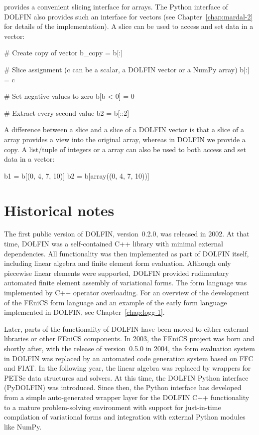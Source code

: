 \numpy provides a convenient slicing interface for \numpy arrays. The
Python interface of DOLFIN also provides such an interface for vectors
(see Chapter~\ref{chap:mardal-2} for details of the implementation). A
slice can be used to access and set data in a vector:
\begin{python}
# Create copy of vector
b_copy = b[:]

# Slice assignment (c can be a scalar, a DOLFIN vector or a NumPy array)
b[:] = c

# Set negative values to zero
b[b < 0] = 0

# Extract every second value
b2 = b[::2]
\end{python}
A difference between a \numpy slice and a slice of a DOLFIN vector is
that a slice of a \numpy array provides a view into the original array,
whereas in DOLFIN we provide a copy. A list/tuple of integers or a \numpy
array can also be used to both access and set data in a vector:
\begin{python}
b1 = b[(0, 4, 7, 10)]
b2 = b[array((0, 4, 7, 10))]
\end{python}

\section{Historical notes}

The first public version of DOLFIN, version~0.2.0, was released in
2002. At that time, DOLFIN was a self-contained C++ library with
minimal external dependencies. All functionality was then implemented
as part of DOLFIN itself, including linear algebra and finite element
form evaluation. Although only piecewise linear elements were
supported, DOLFIN provided rudimentary automated finite element
assembly of variational forms. The form language was implemented by
C++ operator overloading. For an overview of the development of the
FEniCS form language and an example of the early form language
implemented in DOLFIN, see Chapter~\ref{chap:logg-1}.

Later, parts of the functionality of DOLFIN have been moved to either
external libraries or other FEniCS components. In 2003, the FEniCS
project was born and shortly after, with the release of version~0.5.0 in
2004, the form evaluation system in DOLFIN was replaced by an automated
code generation system based on FFC and FIAT. In the following year,
the linear algebra was replaced by wrappers for PETSc data structures
and solvers. At this time, the DOLFIN Python interface ({Py}DOLFIN) was
introduced. Since then, the Python interface has developed from a simple
auto-generated wrapper layer for the DOLFIN C++ functionality to a mature
problem-solving environment with support for just-in-time compilation of
variational forms and integration with external Python modules like NumPy.

